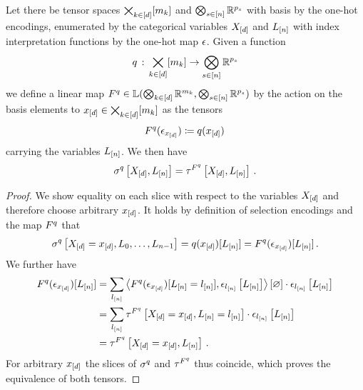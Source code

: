 \begin{theorem}
    \label{the:selectionToBasisEncoding}
    Let there be tensor spaces $\bigtimes_{k\in[d]}[m_{k}]$ and $\bigotimes_{s\in[n]}\mathbb{R}^{p_{s}}$ with basis by the one-hot encodings, enumerated by the categorical variables $X_{[d]}$ and $L_{[n]}$ with index interpretation functions by the one-hot map $\epsilon$.
    Given a function
    \begin{align*}
        q\,:\, \bigtimes_{k\in[d]}[m_{k}] \rightarrow \bigotimes_{s\in[n]}\mathbb{R}^{p_{s}}
    \end{align*}
    we define a linear map $F^{q}\in\mathbb{L}(\bigotimes_{k\in[d]} \mathbb{R}^{m_{k}},\bigotimes_{s\in[n]}\mathbb{R}^{p_{s}})$ by the action on the basis elements to $x_{[d]}\in\bigtimes_{k\in[d]}[m_{k}]$ as the tensors %
    \begin{align*}
        F^{q}(\epsilon_{x_{[d]}}) \coloneqq q(x_{[d]}) \,
    \end{align*}
    carrying the variables $L_{[n]}$.
    We then have
    \begin{align*}
        \sigma^{q}\left[X_{[d]},L_{[n]}\right]
        = \tau^{F^{q}}\left[X_{[d]},L_{[n]}\right] \, .
    \end{align*}
\end{theorem}
\begin{proof}
    We show equality on each slice with respect to the variables $X_{[d]}$ and therefore choose arbitrary $x_{[d]}$. %
    It holds by definition of selection encodings and the map $F^{q}$ that
    \begin{align*}
        \sigma^{q}\left[X_{[d]}=x_{[d]},L_{0},\ldots,L_{n-1}\right]
        = q(x_{[d]})[L_{[n]}]
        = F^{q}(\epsilon_{x_{[d]}})[L_{[n]}] \, .
    \end{align*}
    We further have
    \begin{align*}
        F^{q}(\epsilon_{x_{[d]}})[L_{[n]}]
        &= \sum_{l_{[n]}} \left\langle F^{q}(\epsilon_{x_{[d]}})[L_{[n]}=l_{[n]}],\epsilon_{l_{[n]}}\left[L_{[n]}\right]\right\rangle \left[ \varnothing \right] \cdot \epsilon_{l_{[n]}}\left[L_{[n]}\right] \\
        &= \sum_{l_{[n]}} \tau^{F^{q}}\left[X_{[d]}=x_{[d]},L_{[n]}=l_{[n]}\right] \cdot \epsilon_{l_{[n]}}\left[L_{[n]}\right] \\
        &= \tau^{F^{q}}\left[X_{[d]}=x_{[d]},L_{[n]}\right] \, .
    \end{align*}
    For arbitrary $x_{[d]}$ the slices of $\sigma^{q}$ and $\tau^{F^{q}}$ thus coincide, which proves the equivalence of both tensors.
\end{proof}

